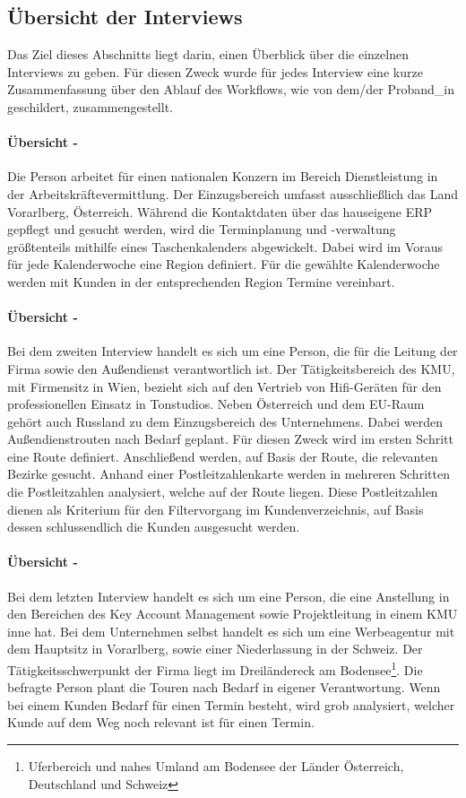 \documentclass[Bachelorarbeit.tex]{subfiles}
\begin{document}
\subsection{Übersicht der Interviews}
\label{UebersichtDerInterviews}
Das Ziel dieses Abschnitts liegt darin, einen Überblick über die einzelnen Interviews zu geben. 
Für diesen Zweck wurde für jedes Interview eine kurze Zusammenfassung über den Ablauf des Workflows, wie von dem/der Proband\_in geschildert, zusammengestellt.

\paragraph*{Übersicht - } 
Die Person arbeitet für einen nationalen Konzern im Bereich Dienstleistung in der Arbeitskräftevermittlung. 
Der Einzugsbereich umfasst ausschließlich das Land Vorarlberg, Österreich.
Während die Kontaktdaten über das hauseigene \ac{ERP} gepflegt und gesucht werden, wird die Terminplanung und -verwaltung größtenteils mithilfe eines Taschenkalenders abgewickelt.
Dabei wird im Voraus für jede Kalenderwoche eine Region definiert. 
Für die gewählte Kalenderwoche werden mit Kunden in der entsprechenden Region Termine vereinbart.\\


\paragraph*{Übersicht - }
Bei dem zweiten Interview handelt es sich um eine Person, die für die Leitung der Firma sowie den Außendienst verantwortlich ist.
Der Tätigkeitsbereich des \ac{KMU}, mit Firmensitz in Wien, bezieht sich auf den Vertrieb von Hifi-Geräten für den professionellen Einsatz in Tonstudios.
Neben Österreich und dem EU-Raum gehört auch Russland zu dem Einzugsbereich des Unternehmens.
Dabei werden Außendienstrouten nach Bedarf geplant.
Für diesen Zweck wird im ersten Schritt eine Route definiert. 
Anschließend werden, auf Basis der Route, die relevanten Bezirke gesucht.
Anhand einer Postleitzahlenkarte werden in mehreren Schritten die Postleitzahlen analysiert, welche auf der Route liegen.
Diese Postleitzahlen dienen als Kriterium für den Filtervorgang im Kundenverzeichnis, auf Basis dessen schlussendlich die Kunden ausgesucht werden.

\paragraph*{Übersicht - }
Bei dem letzten Interview handelt es sich um eine Person, die eine Anstellung in den Bereichen des Key Account Management sowie Projektleitung in einem \ac{KMU} inne hat.
Bei dem Unternehmen selbst handelt es sich um eine Werbeagentur mit dem Hauptsitz in Vorarlberg, sowie einer Niederlassung in der Schweiz.
Der Tätigkeitsschwerpunkt der Firma liegt im Dreiländereck am Bodensee\footnote{Uferbereich und nahes Umland am Bodensee der Länder Österreich, Deutschland und Schweiz}. 
Die befragte Person plant die Touren nach Bedarf in eigener Verantwortung.
Wenn bei einem Kunden Bedarf für einen Termin besteht, wird grob analysiert, welcher Kunde auf dem Weg noch relevant ist für einen Termin.
\end{document}
